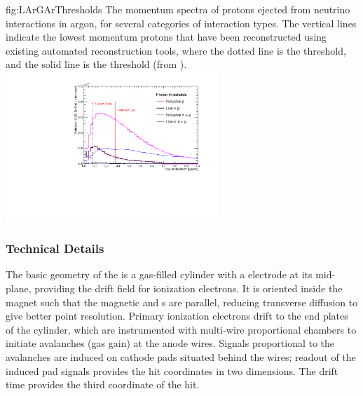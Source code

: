 \begin{dunefigure}{fig:LArGArThresholds}
{The momentum spectra of protons ejected from neutrino interactions in argon, for several categories of interaction types. The vertical lines indicate the lowest momentum protons that have been reconstructed using existing automated reconstruction tools, where the dotted line is the  threshold, and the solid line is the  threshold (from ).}
    \includegraphics[width=0.6\textwidth]{graphics/Threshold.pdf}
\end{dunefigure}


\subsubsection{ Technical Details}
The basic geometry of the  is a gas-filled cylinder with a  electrode at its mid-plane, providing the drift field for ionization electrons. It is oriented inside the magnet such that the magnetic and \efield{}s are parallel, reducing transverse diffusion to give better point resolution. Primary ionization electrons drift to the end plates of the cylinder, which are instrumented with multi-wire proportional chambers to initiate avalanches (gas gain) at the anode wires.  Signals proportional to the avalanches are induced on cathode pads situated behind the wires; readout of the induced pad signals provides the hit coordinates in two dimensions.  The drift time provides the third coordinate of the hit.

